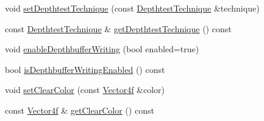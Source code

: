 \begin{DoxyCompactItemize}
\item 
void \hyperlink{classburn_1_1_open_gl_control_1_1_settings_ab03c0de298099147248f541ddc1f19d7}{set\-Depthtest\-Technique} (const \hyperlink{classburn_1_1_open_gl_control_a6435b1cdb4d2c72085a19bb77be9d845}{Depthtest\-Technique} \&technique)
\item 
const \hyperlink{classburn_1_1_open_gl_control_a6435b1cdb4d2c72085a19bb77be9d845}{Depthtest\-Technique} \& \hyperlink{classburn_1_1_open_gl_control_1_1_settings_a3124638304430535f0c2246e5b28d082}{get\-Depthtest\-Technique} () const 
\item 
void \hyperlink{classburn_1_1_open_gl_control_1_1_settings_a7327bb2b002d3b5de45688853d315143}{enable\-Depthbuffer\-Writing} (bool enabled=true)
\item 
bool \hyperlink{classburn_1_1_open_gl_control_1_1_settings_a81423f51754063178cb5c73247150e97}{is\-Depthbuffer\-Writing\-Enabled} () const 
\item 
void \hyperlink{classburn_1_1_open_gl_control_1_1_settings_a20443a883ae7ef314772923438b7866a}{set\-Clear\-Color} (const \hyperlink{namespaceburn_a58a411b9d83c7970518a9250c1c78068}{Vector4f} \&color)
\item 
const \hyperlink{namespaceburn_a58a411b9d83c7970518a9250c1c78068}{Vector4f} \& \hyperlink{classburn_1_1_open_gl_control_1_1_settings_a9ac507df0d2e9d0391bbd4674242c343}{get\-Clear\-Color} () const 
\end{DoxyCompactItemize}


